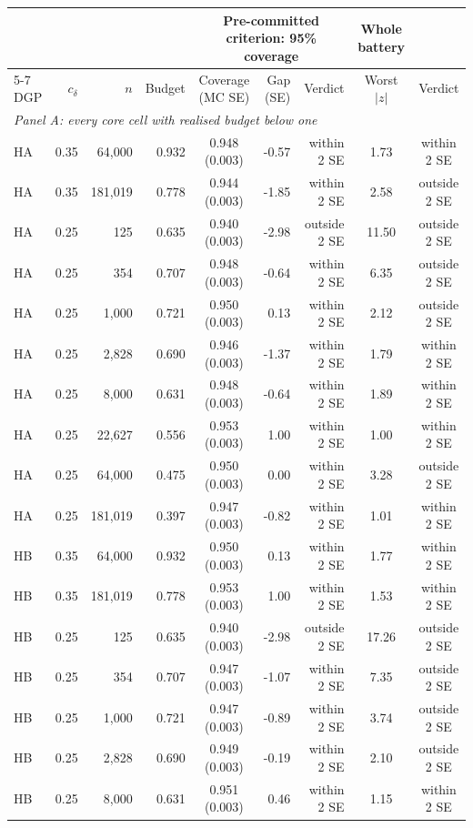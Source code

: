 \begin{tabular}{lrrrcrrcc}
\toprule
 & & & & \multicolumn{3}{c}{Pre-committed criterion: 95\% coverage} & Whole battery & \\
\cmidrule(lr){5-7}
DGP & $c_\delta$ & $n$ & Budget & Coverage (MC SE) & Gap (SE) & Verdict & Worst $|z|$ & Verdict \\
\midrule
\multicolumn{9}{l}{\textit{Panel A: every core cell with realised budget below one}} \\
\midrule
HA & 0.35 & 64,000 & 0.932 & 0.948 (0.003) & -0.57 & within 2 SE & 1.73 & within 2 SE \\
HA & 0.35 & 181,019 & 0.778 & 0.944 (0.003) & -1.85 & within 2 SE & 2.58 & outside 2 SE \\
HA & 0.25 & 125 & 0.635 & 0.940 (0.003) & -2.98 & outside 2 SE & 11.50 & outside 2 SE \\
HA & 0.25 & 354 & 0.707 & 0.948 (0.003) & -0.64 & within 2 SE & 6.35 & outside 2 SE \\
HA & 0.25 & 1,000 & 0.721 & 0.950 (0.003) & 0.13 & within 2 SE & 2.12 & outside 2 SE \\
HA & 0.25 & 2,828 & 0.690 & 0.946 (0.003) & -1.37 & within 2 SE & 1.79 & within 2 SE \\
HA & 0.25 & 8,000 & 0.631 & 0.948 (0.003) & -0.64 & within 2 SE & 1.89 & within 2 SE \\
HA & 0.25 & 22,627 & 0.556 & 0.953 (0.003) & 1.00 & within 2 SE & 1.00 & within 2 SE \\
HA & 0.25 & 64,000 & 0.475 & 0.950 (0.003) & 0.00 & within 2 SE & 3.28 & outside 2 SE \\
HA & 0.25 & 181,019 & 0.397 & 0.947 (0.003) & -0.82 & within 2 SE & 1.01 & within 2 SE \\
HB & 0.35 & 64,000 & 0.932 & 0.950 (0.003) & 0.13 & within 2 SE & 1.77 & within 2 SE \\
HB & 0.35 & 181,019 & 0.778 & 0.953 (0.003) & 1.00 & within 2 SE & 1.53 & within 2 SE \\
HB & 0.25 & 125 & 0.635 & 0.940 (0.003) & -2.98 & outside 2 SE & 17.26 & outside 2 SE \\
HB & 0.25 & 354 & 0.707 & 0.947 (0.003) & -1.07 & within 2 SE & 7.35 & outside 2 SE \\
HB & 0.25 & 1,000 & 0.721 & 0.947 (0.003) & -0.89 & within 2 SE & 3.74 & outside 2 SE \\
HB & 0.25 & 2,828 & 0.690 & 0.949 (0.003) & -0.19 & within 2 SE & 2.10 & outside 2 SE \\
HB & 0.25 & 8,000 & 0.631 & 0.951 (0.003) & 0.46 & within 2 SE & 1.15 & within 2 SE \\

\end{tabular}
